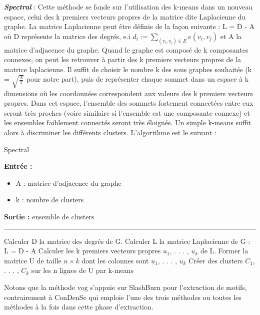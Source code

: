 \documentclass[a4paper,oneside,12pt]{report}
\theoremstyle{definition}
\begin{document}
\begin{enumerate}
\textbf{\textit{Spectral}} : Cette méthode se fonde sur l'utilisation des k-means dans un nouveau espace, celui des k premiers vecteurs propres de la matrice dite Laplacienne du graphe. La matrice Laplacienne peut être définie de la façon suivante : L = D - A où D représente la matrice des degrés, e.i ${d}_{i} := \sum_{(v_i,v_j) \in E} e(v_i,v_j)$ et A la matrice d'adjacence du graphe. Quand le graphe est composé de k composantes connexes, on peut les
retrouver à partir des k premiers vecteurs propres de la matrice
laplacienne. Il suffit de choisir le nombre k des sous graphes souhaités (k = $\sqrt{\frac{\textit{N}}{2}}$ pour notre part), puis de représenter chaque sommet dans un espace à k dimensions où les coordonnées correspondent
aux valeurs des k premiers vecteurs propres. Dans cet espace, l'ensemble des sommets fortement
connectées entre eux seront très proches (voire similaire si l’ensemble est une composante connexe) et les ensembles faiblement connectés seront très éloignés. Un simple
k-means suffit alors à discriminer les différents clusters. L'algorithme est le suivant : 

\begin{algorithm}[H]
					\label{alg:spectral}
					\caption{Spectral}
					\textbf{Entrée :}
						\begin{itemize}[label=$\bullet$]
							\item A : matrice d'adjacence du graphe
							\item k : nombre de clusters 
							
						\end{itemize}
					\textbf{Sortie :} ensemble de clusters\\							\noindent\rule{\textwidth}{1pt}
						
						
				\begin{algorithmic} [1]
				\STATE Calculer D la matrice des degrés de G.				 
				 \STATE Calculer L la matrice Laplacienne de G : L = D - A
				 \STATE  Calculer les k premiers vecteurs propres $u_1$, . . . , $u_k$ de L.
				 \STATE Former la matrice U de taille $n \times k$ dont les colonnes
sont $u_1$, . . . , $u_k$
\STATE Créer des clusters $C_1$, . . . , $C_k$ sur les n lignes de U par
k-means
				\end{algorithmic}
			\end{algorithm}

Notons que la méthode \gls{vog} s'appuie sur SlashBurn pour l'extraction de motifs, contrairement à \gls{ConDenSe} qui emploie l'une des trois méthodes ou toutes les méthodes à la fois dans cette phase d'extraction.


\end{enumerate}
\end{document}
